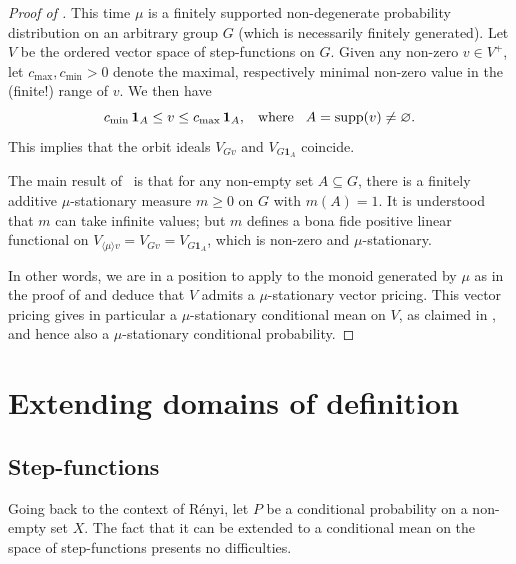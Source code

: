 \documentclass[11pt]{amsart}
\numberwithin{equation}{section}
\theoremstyle{definition}
\theoremstyle{definition}
\newcommand*{\se}{\subseteq}
\newcommand*{\one}{\boldsymbol{1}}
\begin{document}
\begin{proof}[Proof of ]
This time $\mu$ is a finitely supported non-degenerate probability distribution on an arbitrary group $G$ (which is necessarily finitely generated). Let $V$ be the ordered vector space of step-functions on $G$. Given any non-zero $v\in V^+$, let $c_\mathrm{max}, c_\mathrm{min}>0$ denote the maximal, respectively minimal non-zero value in the (finite!) range of $v$. We then have
\begin{equation*}
c_\mathrm{min} \, \one_A \leq v \leq c_\mathrm{max}\,\one_A, \kern3mm\text{where}\kern3mm A=\mathrm{supp}(v) \neq \varnothing.
\end{equation*}
This implies that the orbit ideals $V_{G v}$ and $V_{G \one_A}$ coincide.

The main result of~\cite{Alhalimi-Hutchcroft-Pan-Tamuz-Zheng_pre} is that for any non-empty set $A\se G$, there is a finitely additive $\mu$-stationary measure $m\geq 0$ on $G$ with $m(A)=1$. It is understood that $m$ can take infinite values; but $m$ defines a bona fide positive linear functional on $V_{\langle \mu \rangle v} = V_{G v} = V_{G \one_A}$, which is non-zero and $\mu$-stationary.

In other words, we are in a position to apply   to the monoid generated by $\mu$ as in the proof of  and deduce that $V$ admits a $\mu$-stationary vector pricing. This vector pricing gives in particular a $\mu$-stationary conditional mean on $V$, as claimed in , and hence also a $\mu$-stationary conditional probability.
\end{proof}

\bigskip

\section{Extending domains of definition}\label{sec:extend}%
\nobreak\subsection{Step-functions}\label{sec:CP-CM}%
Going back to the context of R{\'e}nyi, let $P$ be a conditional probability on a non-empty set $X$. The fact that it can be extended to a conditional mean on the space of step-functions presents no difficulties.
\end{document}
